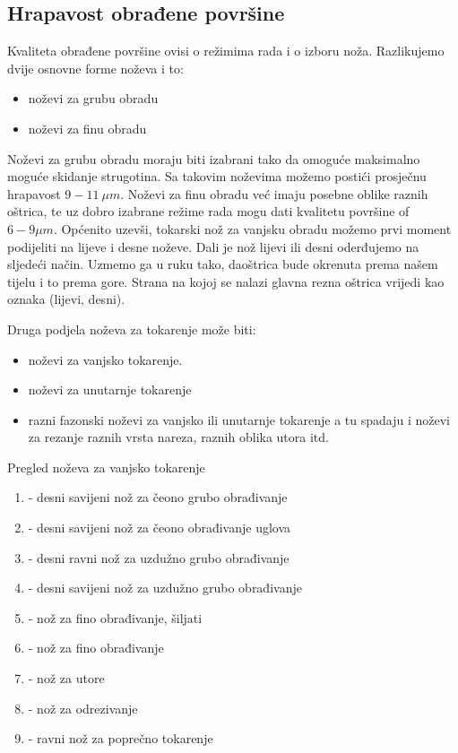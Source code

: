 \documentclass[a4paper,12pt]{article}
\numberwithin{figure}{section}
\begin{document}
\subsection{Hrapavost obrađene površine}
Kvaliteta obrađene površine ovisi o režimima rada i o izboru noža. Razlikujemo dvije osnovne forme noževa i to:
\begin{itemize}
\item noževi za grubu obradu
\item noževi za finu obradu
\end{itemize}
Noževi za grubu obradu moraju biti izabrani tako da omoguće maksimalno moguće skidanje strugotina. Sa takovim noževima možemo postići prosječnu hrapavost  $9 - 11\:\mu m$. Noževi za finu obradu već imaju posebne oblike raznih oštrica, te uz dobro izabrane režime rada mogu dati kvalitetu površine of $6-9 \mu m$. Općenito uzevši, tokarski nož za vanjsku obradu možemo prvi moment podijeliti na lijeve i desne noževe. Dali je nož lijevi ili desni oderđujemo na sljedeći način. Uzmemo ga u ruku tako, daoštrica bude okrenuta prema našem tijelu i to prema gore. Strana na kojoj se nalazi glavna rezna oštrica vrijedi kao oznaka (lijevi, desni).\par
Druga podjela noževa za tokarenje može biti:
\begin{itemize}
\item noževi za vanjsko tokarenje.
\item noževi za unutarnje tokarenje
\item razni fazonski noževi za vanjsko ili unutarnje tokarenje a tu spadaju i noževi za rezanje raznih vrsta nareza, raznih oblika utora itd.
\end{itemize}
Pregled noževa za vanjsko tokarenje
\begin{enumerate}
\item - desni savijeni nož za čeono grubo obrađivanje
\item - desni savijeni nož za čeono obrađivanje uglova
\item - desni ravni nož za uzdužno grubo obrađivanje
\item - desni savijeni nož za uzdužno grubo obrađivanje
\item - nož za fino obrađivanje, šiljati
\item - nož za fino obrađivanje
\item - nož za utore
\item - nož za odrezivanje
\item - ravni nož za poprečno tokarenje
\end{enumerate}
\end{document}
